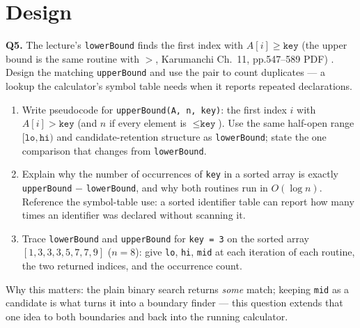 \documentclass[11pt]{article}
\begin{document}
\section{Design}

\textbf{Q5.} The lecture's \texttt{lowerBound} finds the first index with $A[i] \ge \texttt{key}$ (the upper bound is the same routine with $>$, Karumanchi Ch.~11, pp.547--589 PDF) \cite{Karumanchi2017_data_structures_algorithms_made_easy}. Design the matching \texttt{upperBound} and use the pair to count duplicates --- a lookup the calculator's symbol table needs when it reports repeated declarations.
\begin{enumerate}
  \item[(a)] Write pseudocode for \texttt{upperBound(A, n, key)}: the first index $i$ with $A[i] > \texttt{key}$ (and $n$ if every element is $\le \texttt{key}$). Use the same half-open range $[\texttt{lo}, \texttt{hi})$ and candidate-retention structure as \texttt{lowerBound}; state the one comparison that changes from \texttt{lowerBound}.
  \item[(b)] Explain why the number of occurrences of \texttt{key} in a sorted array is exactly \texttt{upperBound} $-$ \texttt{lowerBound}, and why both routines run in $O(\log n)$. Reference the symbol-table use: a sorted identifier table can report how many times an identifier was declared without scanning it.
  \item[(c)] Trace \texttt{lowerBound} and \texttt{upperBound} for \texttt{key = 3} on the sorted array $[1, 3, 3, 3, 5, 7, 7, 9]$ ($n = 8$): give \texttt{lo}, \texttt{hi}, \texttt{mid} at each iteration of each routine, the two returned indices, and the occurrence count.
\end{enumerate}
Why this matters: the plain binary search returns \emph{some} match; keeping \texttt{mid} as a candidate is what turns it into a boundary finder --- this question extends that one idea to both boundaries and back into the running calculator.
\end{document}

